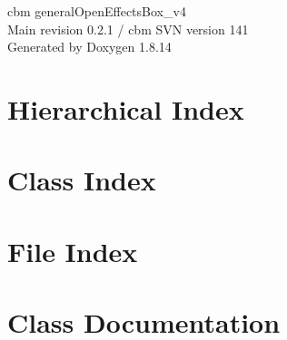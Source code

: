 \documentclass[twoside]{book}
\newcommand{\+}{\discretionary{\mbox{\scriptsize$\hookleftarrow$}}{}{}}
\newcommand{\clearemptydoublepage}{%
  \newpage{\pagestyle{empty}\cleardoublepage}%
}
\begin{document}
\hypersetup{pageanchor=false,
             bookmarksnumbered=true,
             pdfencoding=unicode
            }
\begin{titlepage}
\vspace*{7cm}
\begin{center}%
{\Large cbm general\+Open\+Effects\+Box\+\_\+v4 \\[1ex]\large Main revision 0.\+2.\+1 / cbm S\+VN version 141 }\\
\vspace*{1cm}
{\large Generated by Doxygen 1.8.14}\\
\end{center}
\end{titlepage}
\clearemptydoublepage
{}
\tableofcontents
\clearemptydoublepage
{}
\hypersetup{pageanchor=true}

\chapter{Hierarchical Index}

\chapter{Class Index}

\chapter{File Index}

\chapter{Class Documentation}





















\end{document}
